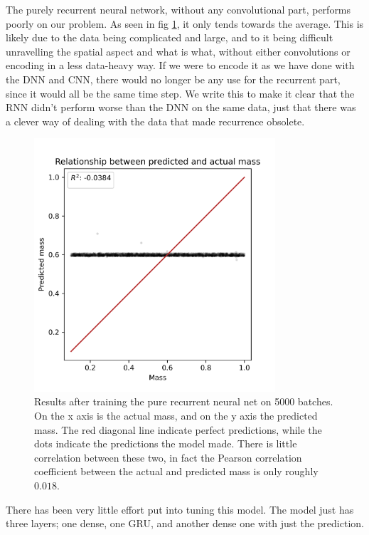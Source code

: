 \documentclass[a4paper]{article}
\begin{document}
The purely recurrent neural network, without any convolutional part, performs poorly on our problem. As seen in fig \ref{fig:rnn-results}, it only tends towards the average. This is likely due to the data being complicated and large, and to it being difficult unravelling the spatial aspect and what is what, without either convolutions or encoding in a less data-heavy way. If we were to encode it as we have done with the DNN and CNN, there would no longer be any use for the recurrent part, since it would all be the same time step. We write this to make it clear that the RNN didn't perform worse than the DNN on the same data, just that there was a clever way of dealing with the data that made recurrence obsolete.

\begin{figure}
    \centering
    \includegraphics[width=0.8\textwidth]{Figures/rnn_results.png}
    \caption{Results after training the pure recurrent neural net on 5000 batches. On the x axis is the actual mass, and on the y axis the predicted mass. The red diagonal line indicate perfect predictions, while the dots indicate the predictions the model made. There is little correlation between these two, in fact the Pearson correlation coefficient between the actual and predicted mass is only roughly $0.018$.}
    \label{fig:rnn-results}
\end{figure}

There has been very little effort put into tuning this model. The model just has three layers; one dense, one GRU, and another dense one with just the prediction.
\end{document}
